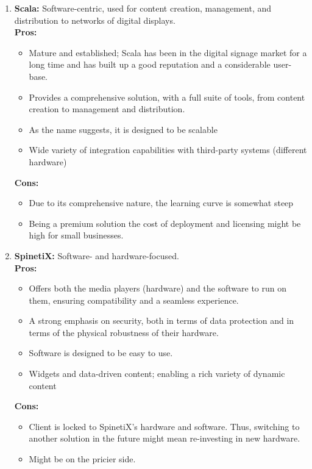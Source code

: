 \documentclass{exam}
\begin{document}
\begin{enumerate}
\pagebreak
\item \textbf{Scala:} Software-centric, used for content creation, management, and distribution to networks of digital displays.\\
\bigskip
\textbf{Pros:}\\
\begin{itemize}
\item Mature and established; Scala has been in the digital signage market for a long time and has built up a good reputation and a considerable user-base.
\item Provides a comprehensive solution, with a full suite of tools, from content creation to management and distribution.
\item As the name suggests, it is designed to be scalable
\item Wide variety of integration capabilities with third-party systems (different hardware)
\end{itemize}
\textbf{Cons:}\\
\begin{itemize}
\item Due to its comprehensive nature, the learning curve is somewhat steep
\item Being a premium solution the cost of deployment and licensing might be high for small businesses.
\end{itemize}
\bigskip


\item \textbf{SpinetiX:} Software- and hardware-focused.\\
\bigskip
\textbf{Pros:}\\
\begin{itemize}
\item Offers both the media players (hardware) and the software to run on them, ensuring compatibility and a seamless experience.
\item A strong emphasis on security, both in terms of data protection and in terms of the physical robustness of their hardware.
\item Software is designed to be easy to use.
\item Widgets and data-driven content; enabling a rich variety of dynamic content
\end{itemize}
\textbf{Cons:}\\
\begin{itemize}
\item Client is locked to SpinetiX's hardware and software. Thus, switching to another solution in the future might mean re-investing in new hardware.
\item Might be on the pricier side.
\end{itemize}
\end{enumerate}
\end{document}
